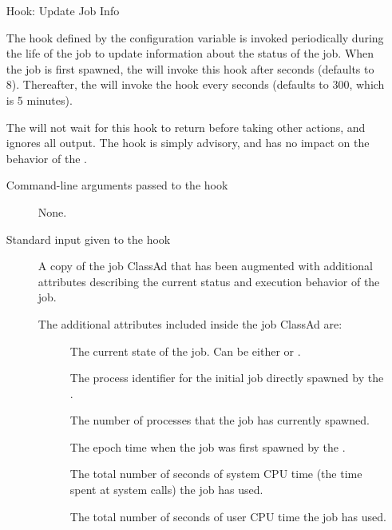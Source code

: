 \begin{itemize}
\item[Hook:  Update Job Info]

The hook defined by the configuration variable
 is invoked periodically during the
life of the job to update information about the status of the job.
When the job is first spawned, the  will invoke this
hook after  seconds
(defaults to 8).
Thereafter, the  will invoke the hook every 
 seconds (defaults to 300,
which is 5 minutes).

The  will not wait for this hook to return before
taking other actions, and ignores all output.
The hook is simply advisory, and has no impact on the behavior of the
.


\begin{description}
\item[Command-line arguments passed to the hook]
  None.

\item[Standard input given to the hook]
  A copy of the job ClassAd that has been augmented with additional
  attributes describing the current status and execution behavior of
  the job.

The additional attributes included inside the job ClassAd are:
\begin{description}
\item[]
  The current state of the job.
  Can be either  or .

\item[]
  The process identifier for the initial job directly spawned by the
  .

\item[]
  The number of processes that the job has currently spawned.

\item[]
  The epoch time when the job was first spawned by the .

\item[]
  The total number of seconds of system CPU time (the time spent at
  system calls) the job has used.

\item[]
  The total number of seconds of user CPU time the job has used.


\end{description}
\end{description}
\end{itemize}
